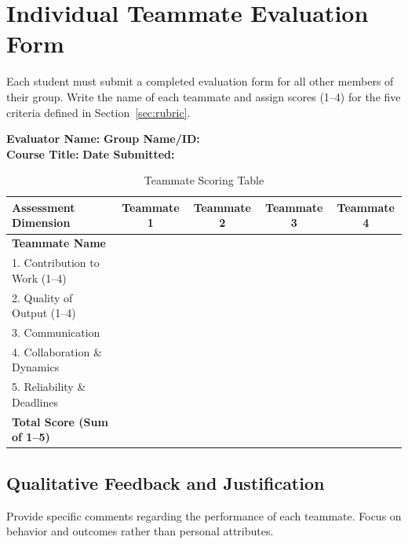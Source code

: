 \section{Individual Teammate Evaluation Form}

Each student must submit a completed evaluation form for all other members of their group. Write the name of each teammate and assign scores (1--4) for the five criteria defined in Section~\ref{sec:rubric}.

\vspace{10pt}

\noindent
\textbf{Evaluator Name:} \hrulefill \quad \textbf{Group Name/ID:} \hrulefill \\
\textbf{Course Title:} \hrulefill \quad \textbf{Date Submitted:} \hrulefill

\vspace{15pt}

\renewcommand{\arraystretch}{1.3}
\begin{table}[H]
\centering
\caption{Teammate Scoring Table}
\label{tab:scoring}
\footnotesize
\begin{tabularx}{\textwidth}{X c c c c}
\toprule
\textbf{Assessment Dimension} & \textbf{Teammate 1} & \textbf{Teammate 2} & \textbf{Teammate 3} & \textbf{Teammate 4} \\
\midrule
\textbf{Teammate Name} & \hspace{2cm} & \hspace{2cm} & \hspace{2cm} & \hspace{2cm} \\
\midrule
1. Contribution to Work (1--4) & & & & \\
2. Quality of Output (1--4) & & & & \\
3. Communication & & & & \\
4. Collaboration \& Dynamics & & & & \\
5. Reliability \& Deadlines & & & & \\
\midrule
\textbf{Total Score (Sum of 1--5)} & & & & \\
\bottomrule
\end{tabularx}
\end{table}

\subsection{Qualitative Feedback and Justification}

Provide specific comments regarding the performance of each teammate. Focus on behavior and outcomes rather than personal attributes.

